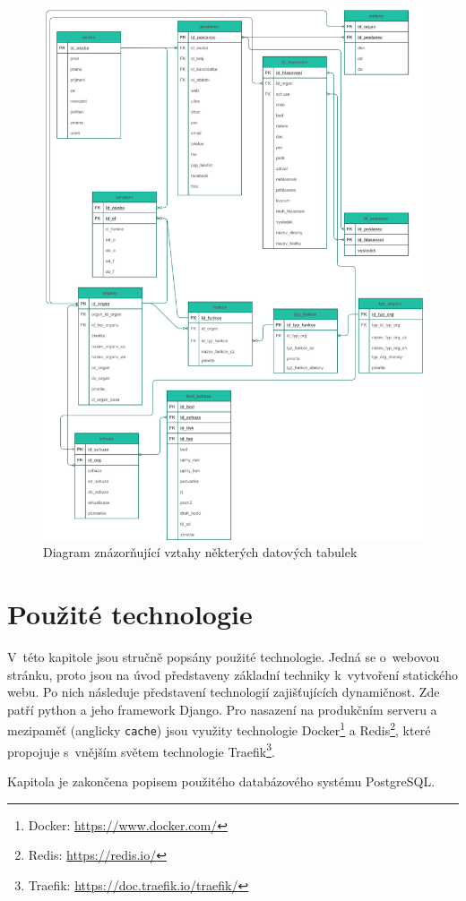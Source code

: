 \begin{figure}
    \centering
    \includegraphics[width=1\textwidth]{obrazky-figures/data_diagramy.pdf}
    \caption{Diagram znázorňující vztahy některých datových tabulek}
    \label{fig:psp-data-diagram}
\end{figure}




\chapter{Použité technologie}
\label{chap:technologie}
V~této kapitole jsou stručně popsány použité technologie. Jedná se o~webovou stránku, proto jsou na úvod představeny základní techniky k~vytvoření statického webu. Po nich následuje představení technologií zajišťujících dynamičnost. Zde patří python a jeho framework Django. Pro nasazení na produkčním serveru a mezipaměť (anglicky \texttt{cache}) jsou využity technologie Docker\footnote{Docker: \url{https://www.docker.com/}} a Redis\footnote{Redis: \url{https://redis.io/}}, které propojuje s~vnějším světem technologie Traefik\footnote{Traefik: \url{https://doc.traefik.io/traefik/}}.
\par Kapitola je zakončena popisem použitého databázového systému PostgreSQL.


